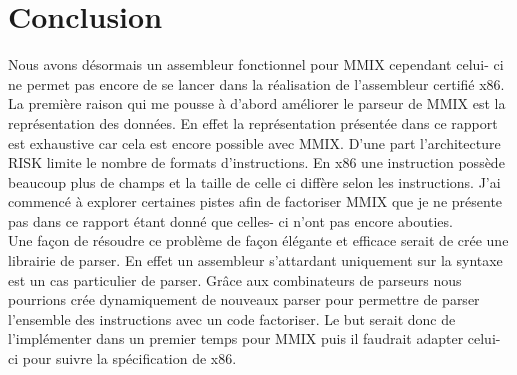 \documentclass {article}
\theoremstyle{definition}
\theoremstyle{remark}
\begin{document}
\section{Conclusion}
\label{conclusion}

Nous avons désormais un assembleur fonctionnel pour MMIX cependant celui- ci ne permet pas encore de se lancer
dans la réalisation de l'assembleur certifié x86.\\
La première raison qui me pousse à d'abord améliorer le parseur de MMIX est la représentation des données.
En effet la représentation présentée dans ce rapport est exhaustive car cela est encore possible avec
MMIX. D'une part l'architecture RISK limite le nombre de formats d'instructions. En x86 une instruction possède
beaucoup plus de champs et la taille de celle ci diffère selon les instructions. J'ai commencé à explorer certaines
pistes afin de factoriser MMIX que je ne présente pas dans ce rapport étant donné que celles- ci n'ont pas encore abouties.
\\
Une façon de résoudre ce problème de façon élégante et efficace serait de crée une librairie de parser.
En effet un assembleur s'attardant uniquement sur la syntaxe est un cas particulier de parser.
Grâce aux combinateurs de parseurs nous pourrions crée dynamiquement de nouveaux parser pour
permettre de parser l'ensemble des instructions avec un code factoriser. Le but serait donc de l'implémenter
dans un premier temps pour MMIX puis il faudrait adapter celui- ci pour suivre la spécification de x86.

\end{document}
